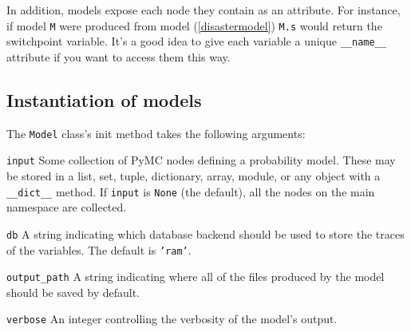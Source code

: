 In addition, models expose each node they contain as an attribute. For instance, if model \texttt{M} were produced from model (\ref{disastermodel}) \texttt{M.s} would return the switchpoint variable. It's a good idea to give each variable a unique \texttt{__name__} attribute if you want to access them this way.


\subsection{Instantiation of models} \label{sec:ModelInstantiation}
The \texttt{Model} class's init method takes the following arguments:
\begin{description}
    \item \texttt{input} Some collection of PyMC nodes defining a probability model. These may be stored in a list, set, tuple, dictionary, array, module, or any object with a \texttt{__dict__} method. If \texttt{input} is \texttt{None} (the default), all the nodes on the main namespace are collected.
    \item \texttt{db} A string indicating which database backend should be used to store the traces of the variables. The default is \texttt{'ram'}.
    \item \texttt{output_path} A string indicating where all of the files produced by the model should be saved by default.
    \item \texttt{verbose} An integer controlling the verbosity of the model's output.
\end{description}